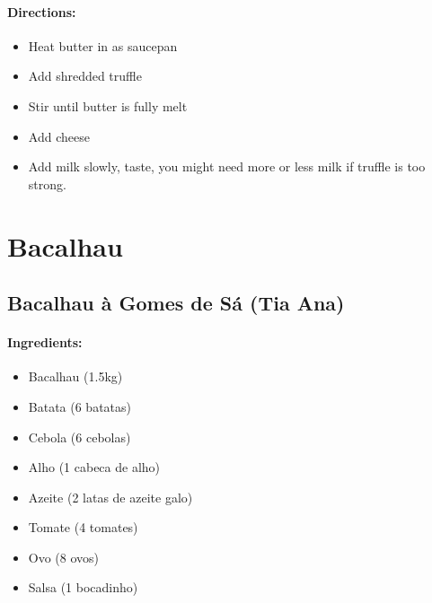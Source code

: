 \documentclass{article}
\begin{document}
\paragraph{Directions:}
\begin{itemize}
    \item Heat butter in as saucepan
    \item Add shredded truffle
    \item Stir until butter is fully melt
    \item Add cheese
    \item Add milk slowly, taste, you might need more or less milk if truffle is too strong.
\end{itemize}

\section{Bacalhau}


\subsection{Bacalhau à Gomes de Sá (Tia Ana)}

\paragraph{Ingredients:}
\begin{itemize}
    \item Bacalhau (1.5kg)
    \item Batata (6 batatas)
    \item Cebola (6 cebolas)
    \item Alho (1 cabeca de alho)
    \item Azeite (2 latas de azeite galo)
    \item Tomate (4 tomates)
    \item Ovo (8 ovos)
    \item Salsa (1 bocadinho)
\end{itemize}
\end{document}
